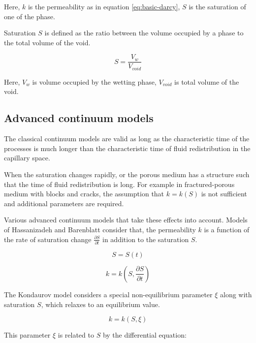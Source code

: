 	Here, $k$ is the permeability as in equation \ref{eq:basic-darcy}, $S$ is the saturation of one of the phase.

	Saturation $S$ is defined as the ratio between the volume occupied by a phase to the total volume of the void.

	\begin{equation}
		S = \frac{V_{w}}{V_{void}}
	\end{equation}
	
	Here, $V_{w}$ is volume occupied by the wetting phase, $V_{void}$ is total volume of the void.
	
\subsection{Advanced continuum models}
	The classical continuum models are valid as long as the characteristic time of the processes is much longer than the characteristic time of fluid redistribution in the capillary space.
	
	When the saturation changes rapidly, or the porous medium has a structure such that the time of fluid redistribution is long. For example in fractured-porous medium with blocks and cracks, the assumption that $k = k(S)$ is not sufficient and additional parameters are required.

	Various advanced continuum models that take these effects into account. Models of Hassanizadeh \cite{hassanizadeh2004continuum} \cite{hassanizadeh1987high} and Barenblatt \cite{barenblatt1960basic} consider that, the permeability $k$ is a function of the rate of saturation change $\frac{\partial S}{\partial t}$ in addition to the saturation $S$.                  
	
	\begin{equation}
		S = S(t)
	\end{equation}
		
	\begin{equation}
		k = k(S, \frac{\partial S}{\partial t})
	\end{equation}
	
	The Kondaurov model \cite{kondaurov2009non} considers a special non-equilibrium parameter $\xi$ along with saturation $S$, which relaxes to an equilibrium value. \cite{kondaurov2007thermodynamically}
	
	\begin{equation}
		k = k(S, \xi)
	\end{equation}
	
	This parameter $\xi$ is related to $S$ by the differential equation:
	
